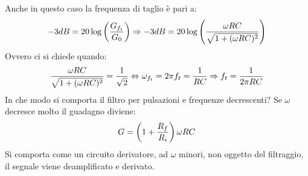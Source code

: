 \documentclass[a4paper, 15pt]{article}
\begin{document}
\begin{adjustwidth}{2in}{}
\begin{figure}[H]
   		\end{figure}   		
   		Anche in questo caso la frequenza di taglio è pari a:
   		\[-3 dB = 20\log\left(G_{f_t}\over G_0\right) \Rightarrow -3 dB = 20\log\left({\omega RC\over \sqrt{1+(\omega RC)^2}}\right)\]
   		Ovvero ci si chiede quando: 
   		\[{\omega RC\over \sqrt{1+(\omega RC)^2}} = {1\over\sqrt{2}} \Leftrightarrow \omega_{f_t} = 2\pi f_t = {1\over RC} \Rightarrow f_t = {1\over2\pi RC}\]
   		In che modo si comporta il filtro per pulsazioni e frequenze decrescenti? Se $\omega$ decresce molto il guadagno diviene: 
   		\[G = \left(1+{R_f\over R_i}\right)\omega RC\]
   		Si comporta come un circuito derivatore, ad $\omega$ minori, non oggetto del filtraggio, il segnale viene deamplificato e derivato. 
\end{adjustwidth}
\newpage
\end{document}
